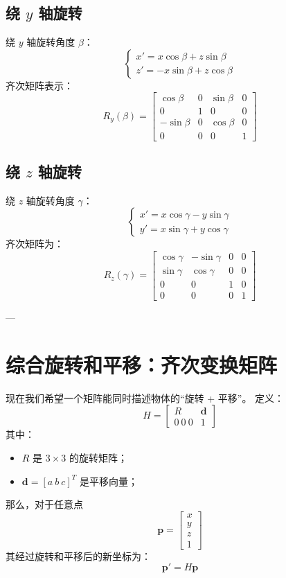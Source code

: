 \documentclass[12pt,a4paper]{article}
\begin{document}
\subsection{绕 $y$ 轴旋转}
绕 $y$ 轴旋转角度 $\beta$：
\[
\begin{cases}
x' = x\cos\beta + z\sin\beta \\
z' = -x\sin\beta + z\cos\beta
\end{cases}
\]
齐次矩阵表示：
\[
R_y(\beta) =
\begin{bmatrix}
\cos\beta & 0 & \sin\beta & 0\\
0 & 1 & 0 & 0\\
-\sin\beta & 0 & \cos\beta & 0\\
0 & 0 & 0 & 1
\end{bmatrix}
\]

\subsection{绕 $z$ 轴旋转}
绕 $z$ 轴旋转角度 $\gamma$：
\[
\begin{cases}
x' = x\cos\gamma - y\sin\gamma \\
y' = x\sin\gamma + y\cos\gamma
\end{cases}
\]
齐次矩阵为：
\[
R_z(\gamma) =
\begin{bmatrix}
\cos\gamma & -\sin\gamma & 0 & 0\\
\sin\gamma & \cos\gamma & 0 & 0\\
0 & 0 & 1 & 0\\
0 & 0 & 0 & 1
\end{bmatrix}
\]

---

\section{综合旋转和平移：齐次变换矩阵}
现在我们希望一个矩阵能同时描述物体的“旋转 + 平移”。  
定义：
\[
H =
\begin{bmatrix}
R & \boldsymbol{d} \\
0\ 0\ 0 & 1
\end{bmatrix}
\]
其中：
\begin{itemize}
  \item \(R\) 是 \(3\times3\) 的旋转矩阵；
  \item \(\boldsymbol{d} = [a\ b\ c]^T\) 是平移向量；
\end{itemize}

那么，对于任意点
\[
\boldsymbol{p} = 
\begin{bmatrix}
x \\ y \\ z \\ 1
\end{bmatrix}
\]
其经过旋转和平移后的新坐标为：
\[
\boldsymbol{p}' = H \boldsymbol{p}
\]
\end{document}
